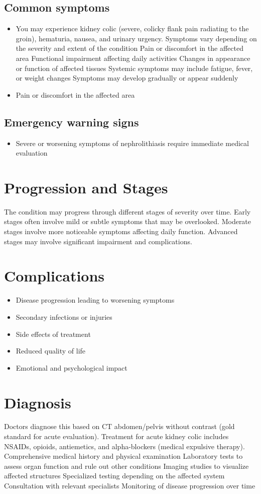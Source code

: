 \subsection{Common symptoms}
\begin{itemize}[noitemsep]
  \item You may experience kidney colic (severe, colicky flank pain radiating to the groin), hematuria, nausea, and urinary urgency. Symptoms vary depending on the severity and extent of the condition Pain or discomfort in the affected area Functional impairment affecting daily activities Changes in appearance or function of affected tissues Systemic symptoms may include fatigue, fever, or weight changes Symptoms may develop gradually or appear suddenly
  \item Pain or discomfort in the affected area
  \end{itemize}

\subsection{Emergency warning signs}
\begin{itemize}[noitemsep]
  \item Severe or worsening symptoms of nephrolithiasis require immediate medical evaluation
\end{itemize}
\section{Progression and Stages}
The condition may progress through different stages of severity over time. Early stages often involve mild or subtle symptoms that may be overlooked. Moderate stages involve more noticeable symptoms affecting daily function. Advanced stages may involve significant impairment and complications.
\section{Complications}
\begin{itemize}[noitemsep]
  \item Disease progression leading to worsening symptoms
  \item Secondary infections or injuries
  \item Side effects of treatment
  \item Reduced quality of life
  \item Emotional and psychological impact
\end{itemize}
\section{Diagnosis}
Doctors diagnose this based on CT abdomen/pelvis without contrast (gold standard for acute evaluation). Treatment for acute kidney colic includes NSAIDs, opioids, antiemetics, and alpha-blockers (medical expulsive therapy). Comprehensive medical history and physical examination Laboratory tests to assess organ function and rule out other conditions Imaging studies to visualize affected structures Specialized testing depending on the affected system Consultation with relevant specialists Monitoring of disease progression over time

